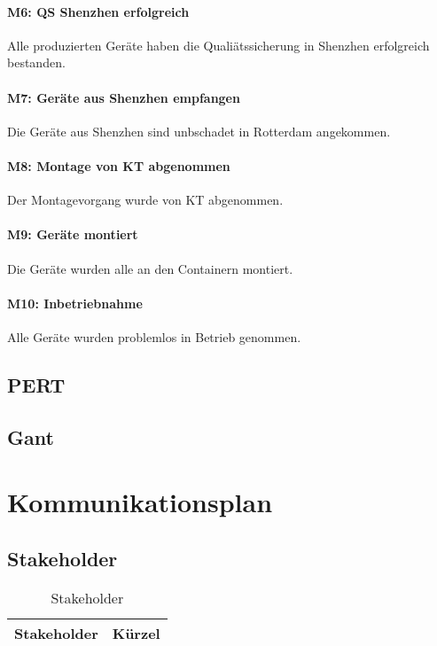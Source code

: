 \paragraph{M6: QS Shenzhen erfolgreich} Alle produzierten Geräte haben die Qualiätssicherung in Shenzhen erfolgreich bestanden.
\paragraph{M7: Geräte aus Shenzhen empfangen} Die Geräte aus Shenzhen sind unbschadet in Rotterdam angekommen.
\paragraph{M8: Montage von KT abgenommen} Der Montagevorgang wurde von KT abgenommen.
\paragraph{M9: Geräte montiert} Die Geräte wurden alle an den Containern montiert.
\paragraph{M10: Inbetriebnahme} Alle Geräte wurden problemlos in Betrieb genommen.




\subsection{PERT} %

\subsection{Gant} %

\section{Kommunikationsplan}
\subsection{Stakeholder}
\begin{table}[H]
    \renewcommand{\arraystretch}{1.1}
    \begin{center}
        \begin{tabular}{l|l}
            \textbf{Stakeholder} & \textbf{Kürzel}\\\hline
            
            
            
            
        \end{tabular}
    \end{center}
    \caption{Stakeholder}
\end{table}
